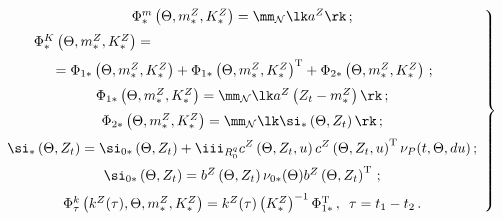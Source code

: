 \begin{equation}

\left.

\begin{array}{c}

\Phi_*^m\left(\Theta, m_*^Z, K_*^Z\right)=\mm_{\cal N} \lk a^Z\rk\,;

\\[6pt]

    \hspace*{-55mm}\Phi_*^K \left(\Theta, m_*^Z, K_*^Z\right)={}\hspace*{55pt}\\[6pt]

    {}=\Phi_{1*} \left(\Theta, m_*^Z, K_*^Z\right)+

    \Phi_{1*}\left(\Theta, m_*^Z, K_*^Z\right)^{\mathrm{T}} + 

    \Phi_{2*} \left(\Theta, m_*^Z, K_*^Z\right)\,;

\\[6pt]

    \Phi_{1*} \left(\Theta, m_*^Z, K_*^Z\right)= \mm_{\cal N} \lk a^Z 

    \left(Z_t -m_*^Z\right)\rk\,;

    \\[6pt]

    \Phi_{2*} \left(\Theta, m_*^Z, K_*^Z\right)= \mm_{\cal N} 

    \lk \si_* \left(\Theta,Z_t\right)\rk\,;

\\[6pt]

    \si_* \left(\Theta,Z_t\right)=\si_{0*} \left(\Theta,Z_t\right)+

   \displaystyle \iii_{R_0^q} c^Z \left(\Theta,Z_t,u\right) c^Z \left(\Theta,Z_t,u\right)^{\mathrm{T}}

    \nu_P(t,\Theta,du)\,;

\\[6pt]

    \si_{0*} \left(\Theta,Z_t\right)=b^Z \left(\Theta,Z_t\right)\nu_{0*}(\Theta) 

    b^Z\left(\Theta,Z_t\right)^{\mathrm{T}}\,;

\\[6pt]

    \Phi_\tau^k \left( k^Z(\tau), \Theta, m_*^Z, K_*^Z\right) = 

    k^Z(\tau) \left(K_*^Z\right)^{-1} \Phi_{1*}^{\mathrm{T}}\,, \enskip 

    \tau = t_1-t_2\,.

    \end{array}

    \right\}

    \label{e3.4-s2}

    \end{equation}

